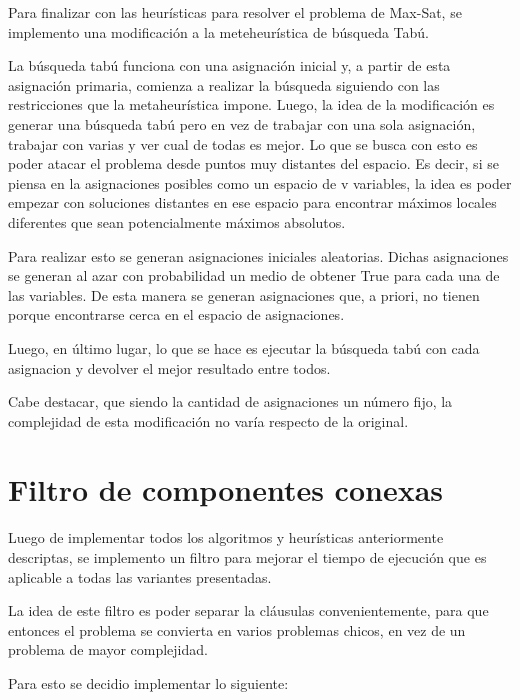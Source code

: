 \documentclass[a4paper,10pt]{article}
\begin{document}
Para finalizar con las heur\'isticas para resolver el problema de Max-Sat, se implemento una modificaci\'on a la meteheur\'istica de b\'usqueda Tab\'u.

La b\'usqueda tab\'u funciona con una asignaci\'on inicial y, a partir de esta asignaci\'on primaria, comienza a realizar la b\'usqueda siguiendo con las restricciones que la metaheur\'istica impone. Luego, la idea de la modificaci\'on es generar una b\'usqueda tab\'u pero en vez de trabajar con una sola asignaci\'on, trabajar con varias y ver cual de todas es mejor. Lo que se busca con esto es poder atacar el problema desde puntos muy distantes del espacio. Es decir, si se piensa en la asignaciones posibles como un espacio de v variables, la idea es poder empezar con soluciones distantes en ese espacio para encontrar m\'aximos locales diferentes que sean potencialmente m\'aximos absolutos.

Para realizar esto se generan asignaciones iniciales aleatorias. Dichas asignaciones se generan al azar con probabilidad un medio de obtener True para cada una de las variables. De esta manera se generan asignaciones que, a priori, no tienen porque encontrarse cerca en el espacio de asignaciones.

Luego, en \'ultimo lugar, lo que se hace es ejecutar la b\'usqueda tab\'u con cada asignacion y devolver el mejor resultado entre todos.

Cabe destacar, que siendo la cantidad de asignaciones un n\'umero fijo, la complejidad de esta modificaci\'on no var\'ia respecto de la original.


\section*{Filtro de componentes conexas}


Luego de implementar todos los algoritmos y heur\'isticas anteriormente descriptas, se implemento un filtro para mejorar el tiempo de ejecuci\'on que es aplicable a todas las variantes presentadas.

La idea de este filtro es poder separar la cl\'ausulas convenientemente, para que entonces el problema se convierta en varios problemas chicos, en vez de un problema de mayor complejidad.

Para esto se decidio implementar lo siguiente:
\end{document}
